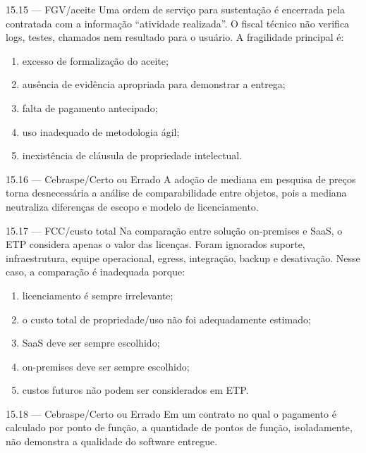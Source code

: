 \begin{questao}{ 15.15 — FGV/aceite}
Uma ordem de serviço para sustentação é encerrada pela contratada com a informação ``atividade realizada''. O fiscal técnico não verifica logs, testes, chamados nem resultado para o usuário. A fragilidade principal é:
\begin{enumerate}[label=\Alph*)]
\item excesso de formalização do aceite;
\item ausência de evidência apropriada para demonstrar a entrega;
\item falta de pagamento antecipado;
\item uso inadequado de metodologia ágil;
\item inexistência de cláusula de propriedade intelectual.
\end{enumerate}
\end{questao}

\begin{questao}{ 15.16 — Cebraspe/Certo ou Errado}
A adoção de mediana em pesquisa de preços torna desnecessária a análise de comparabilidade entre objetos, pois a mediana neutraliza diferenças de escopo e modelo de licenciamento.
\end{questao}

\begin{questao}{ 15.17 — FCC/custo total}
Na comparação entre solução on-premises e SaaS, o ETP considera apenas o valor das licenças. Foram ignorados suporte, infraestrutura, equipe operacional, egress, integração, backup e desativação. Nesse caso, a comparação é inadequada porque:
\begin{enumerate}[label=\Alph*)]
\item licenciamento é sempre irrelevante;
\item o custo total de propriedade/uso não foi adequadamente estimado;
\item SaaS deve ser sempre escolhido;
\item on-premises deve ser sempre escolhido;
\item custos futuros não podem ser considerados em ETP.
\end{enumerate}
\end{questao}

\begin{questao}{ 15.18 — Cebraspe/Certo ou Errado}
Em um contrato no qual o pagamento é calculado por ponto de função, a quantidade de pontos de função, isoladamente, não demonstra a qualidade do software entregue.
\end{questao}


